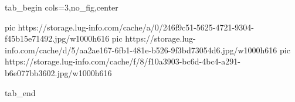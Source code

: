  
 
 
 
 


\ifcmt
  tab_begin cols=3,no_fig,center

     pic https://storage.lug-info.com/cache/a/0/246f9c51-5625-4721-9304-f45b15e71492.jpg/w1000h616%
		 pic https://storage.lug-info.com/cache/d/5/aa2ae167-6fb1-481e-b526-9f3bd73054d6.jpg/w1000h616%
		 pic https://storage.lug-info.com/cache/f/8/f10a3903-bc6d-4bc4-a291-b6e077bb3602.jpg/w1000h616%

  tab_end
\fi
